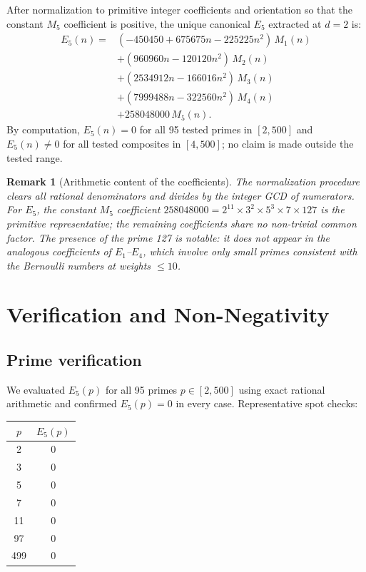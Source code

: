 \documentclass[11pt]{article}
\newtheorem{remark}[theorem]{Remark}
\begin{document}
After normalization to primitive integer coefficients and orientation so that the constant
$M_5$ coefficient is positive, the unique canonical $E_5$ extracted at $d=2$ is:
\begin{equation}
\label{eq:E5-formula}
\begin{aligned}
E_5(n)={}&(-450450+675675n-225225n^2)\,M_1(n)\\
&+(960960n-120120n^2)\,M_2(n)\\
&+(2534912n-166016n^2)\,M_3(n)\\
&+(7999488n-322560n^2)\,M_4(n)\\
&+258048000\,M_5(n).
\end{aligned}
\end{equation}
By computation, $E_5(n)=0$ for all 95 tested primes in $[2,500]$ and $E_5(n)\neq 0$ for all tested composites in $[4,500]$; no claim is made outside the tested range.

\begin{remark}[Arithmetic content of the coefficients]
\label{rem:E5-coeffs}
The normalization procedure clears all rational denominators and divides by the integer
GCD of numerators.
For $E_5$, the constant $M_5$ coefficient $258048000 = 2^{11}\times 3^2\times 5^3\times 7\times 127$
is the primitive representative; the remaining coefficients share no non-trivial common
factor.
The presence of the prime 127 is notable: it does not appear in the analogous coefficients
of $E_1$--$E_4$, which involve only small primes consistent with the Bernoulli numbers at
weights $\le 10$.
\end{remark}

\section{Verification and Non-Negativity}
\label{sec:nonnegativity}

\subsection{Prime verification}

We evaluated $E_5(p)$ for all 95 primes $p\in[2,500]$ using exact rational arithmetic and
confirmed $E_5(p)=0$ in every case.
Representative spot checks:

\begin{table}[htbp]
\centering
\begin{tabular}{@{}cc@{}}
\toprule
$p$ & $E_5(p)$ \\
\midrule
2 & 0 \\
3 & 0 \\
5 & 0 \\
7 & 0 \\
11 & 0 \\
97 & 0 \\
499 & 0 \\
\bottomrule
\end{tabular}
\end{table}
\end{document}
